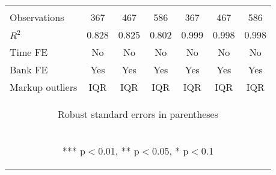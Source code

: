 \documentclass[]{article}
\begin{document}
\begin{center}
\begin{tabular}{lcccccc}
\vspace{4pt} & \begin{footnotesize}\end{footnotesize} & \begin{footnotesize}\end{footnotesize} & \begin{footnotesize}\end{footnotesize} & \begin{footnotesize}\end{footnotesize} & \begin{footnotesize}\end{footnotesize} & \begin{footnotesize}\end{footnotesize} \\
Observations & 367 & 467 & 586 & 367 & 467 & 586 \\
$R^2$ & 0.828 & 0.825 & 0.802 & 0.999 & 0.998 & 0.998 \\
Time FE & No & No & No & No & No & No \\
Bank FE & Yes & Yes & Yes & Yes & Yes & Yes \\
 Markup outliers & IQR & IQR & IQR & IQR & IQR & IQR \\ \hline
\multicolumn{7}{c}{\begin{footnotesize} Robust standard errors in parentheses\end{footnotesize}} \\
\multicolumn{7}{c}{\begin{footnotesize} *** p$<$0.01, ** p$<$0.05, * p$<$0.1\end{footnotesize}} \\
\end{tabular}
\end{center}
\end{document}
